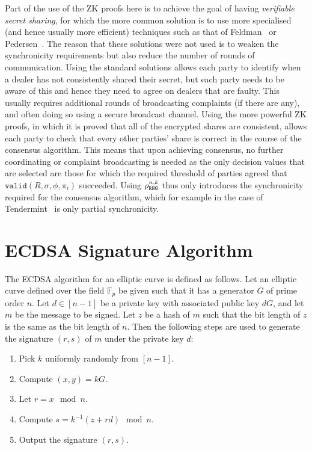\documentclass{article}
\newcommand{\seq}[1]{\left[#1\right]}
\theoremstyle{remark}
\begin{document}
Part of the use of the ZK proofs here is to achieve the goal of having
\textit{verifiable secret sharing}, for which the more common solution is to
use more specialised (and hence usually more efficient) techniques such as that
of Feldman~\cite{feldman_1987} or Pedersen~\cite{p91a}. The reason
that these solutions were not used is to weaken the synchronicity requirements
but also reduce the number of rounds of communication. Using the standard
solutions allows each party to identify when a dealer has not consistently
shared their secret, but each party needs to be aware of this and hence they
need to agree on dealers that are faulty. This usually requires additional
rounds of broadcasting complaints (if there are any), and often doing so using
a secure broadcast channel. Using the more powerful ZK proofs, in which it is
proved that all of the encrypted shares are consistent, allows each party to
check that every other parties' share is correct in the course of the consensus
algorithm. This means that upon achieving consensus, no further coordinating or
complaint broadcasting is needed as the only decision values that are selected
are those for which the required threshold of parties agreed that
$\texttt{valid}(R, \sigma, \phi, \pi_i)$ succeeded. Using $\rho_\texttt{RNG}^{n, k}$ thus
only introduces the synchronicity required for the consensus algorithm, which
for example in the case of Tendermint~\cite{buchman_2018} is only partial
synchronicity.

\section{ECDSA Signature Algorithm}

The ECDSA algorithm for an elliptic curve is defined as follows. Let an
elliptic curve defined over the field $\mathbb{F}_p$ be given such that it has
a generator $G$ of prime order $n$. Let $d \in \seq{n-1}$ be a private key with
associated public key $dG$, and let $m$ be the message to be signed. Let $z$ be
a hash of $m$ such that the bit length of $z$ is the same as the bit length of
$n$. Then the following steps are used to generate the signature $(r, s)$ of
$m$ under the private key $d$:

\begin{enumerate}
	\item Pick $k$ uniformly randomly from $\seq{n-1}$.
	\item Compute $(x, y) = kG$.
	\item Let $r = x \mod n$.
	\item Compute $s = k^{-1}(z + rd) \mod n$.
	\item Output the signature $(r, s)$.
\end{enumerate}
\end{document}
